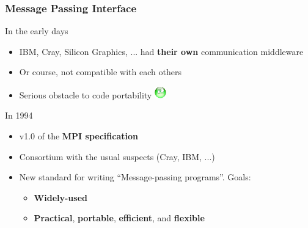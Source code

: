 \documentclass[xcolor={x11names,svgnames,psnames}]{beamer}
\newcommand{\triste}{\includegraphics[width=0.5cm,trim=0 17mm 0 0]{triste}}
\begin{document}
\begin{frame}
  \frametitle{Message Passing Interface}

  \begin{block}{In the early days}
    \begin{itemize}
    \item IBM, Cray, Silicon Graphics, ... had \textbf{their own} communication middleware
    \item Or course, \alert{not compatible} with each others
    \item Serious obstacle to code portability \triste
    \end{itemize}
  \end{block}

  \medskip
  
  \begin{exampleblock}{In 1994}
    \begin{itemize}
    \item v1.0 of the \textbf{MPI specification}
    \item Consortium with the usual suspects (Cray, IBM, ...)
    \item New standard for writing ``Message-passing programs''. Goals:
      \begin{itemize}
      \item \textbf{Widely-used}
      \item \textbf{Practical}, \textbf{portable}, \textbf{efficient}, and \textbf{flexible}
      \end{itemize}
    \end{itemize}
  \end{exampleblock}
\end{frame}

\end{document}
